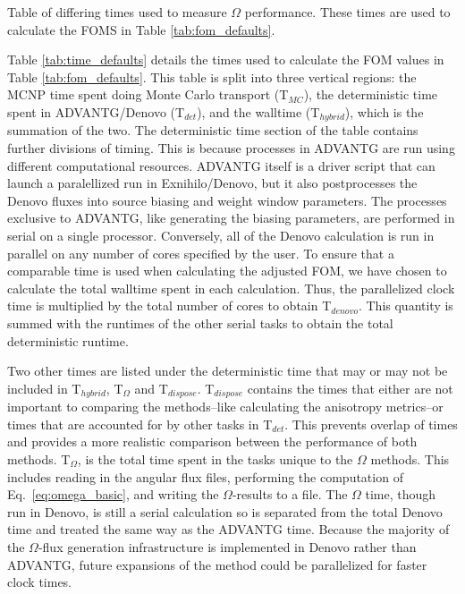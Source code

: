 \begin{table}[h!]
  \centering
  
  \caption[Table of differing times used to measure $\Omega$ performance.]{
    Table of differing times used to measure $\Omega$ performance. These times
    are used to calculate the FOMS in Table \ref{tab:fom_defaults}. }
  \label{tab:time_defaults}
\end{table}

Table \ref{tab:time_defaults} details the times used to calculate the
FOM values in Table \ref{tab:fom_defaults}. This table is split into three
vertical regions: the MCNP time spent doing Monte Carlo transport (T$_{MC}$),
the deterministic time spent in ADVANTG/Denovo (T$_{det}$),
and the walltime (T$_{hybrid}$), which is the
summation of the two. 
The deterministic time section of the table contains
further divisions of timing. This is because processes in ADVANTG are
run using different computational resources. ADVANTG itself is a driver script
that can launch a paralellized run in Exnihilo/Denovo, but it also postprocesses the
Denovo fluxes into source biasing and weight window parameters. The processes
exclusive to ADVANTG, like generating the biasing parameters, are performed in
serial on a single processor. Conversely, all of the Denovo calculation is run
in parallel on any number of cores specified by the user. To ensure that a
comparable time is used when calculating the adjusted FOM, we have chosen to
calculate the total walltime spent in each calculation. Thus, the parallelized
clock time is multiplied by the total number of cores to obtain T$_{denovo}$.
This quantity is summed with
the runtimes of the other serial tasks to obtain the total deterministic runtime.

Two other times are listed under the deterministic time that may or may not be
included in T$_{hybrid}$, T$_{\Omega}$ and T$_{dispose}$. T$_{dispose}$ contains the times that either are not
important to comparing the methods--like calculating the anisotropy metrics--or
times that are accounted for by other tasks in T$_{det}$. This prevents overlap
of times and provides a more realistic comparison between the performance of
both methods.
T$_{\Omega}$, is the total
time spent in the tasks unique to the $\Omega$ methods. This includes reading
in the angular flux files, performing the computation of Eq.\
\eqref{eq:omega_basic}, and writing the $\Omega$-results to a file.
The $\Omega$ time,
though run in Denovo, is still a serial calculation so is separated from the
total Denovo time and treated the same way as the 
ADVANTG time. Because the majority of the $\Omega$-flux generation
infrastructure is implemented in Denovo rather than ADVANTG, future expansions
of the method could be parallelized for faster clock times.

